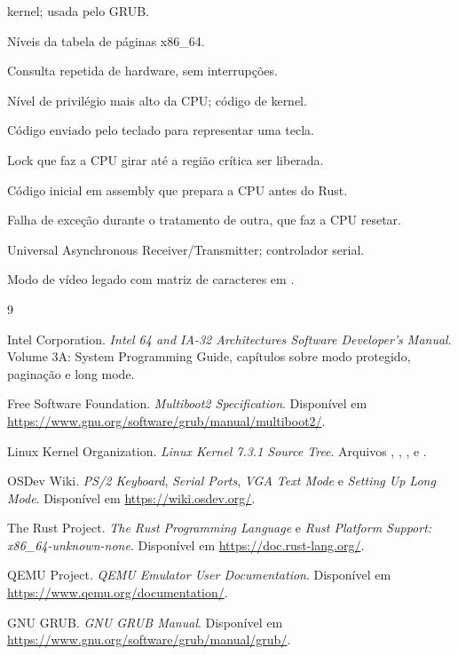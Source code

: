 \begin{description}[style=nextline,leftmargin=2em]
        kernel; usada pelo GRUB.
  \item[PML4/PDPT/PD] N\'iveis da tabela de p\'aginas x86\_64.
  \item[Polling] Consulta repetida de hardware, sem interrup\c{c}\~oes.
  \item[Ring 0] N\'ivel de privil\'egio mais alto da CPU; c\'odigo de kernel.
  \item[Scancode] C\'odigo enviado pelo teclado para representar uma tecla.
  \item[Spinlock] Lock que faz a CPU girar at\'e a regi\~ao cr\'itica ser
        liberada.
  \item[Stub] C\'odigo inicial em assembly que prepara a CPU antes do Rust.
  \item[Triple fault] Falha de exce\c{c}\~ao durante o tratamento de outra,
        que faz a CPU resetar.
  \item[UART] Universal Asynchronous Receiver/Transmitter; controlador
        serial.
  \item[VGA texto] Modo de v\'ideo legado com matriz de caracteres em
        .
\end{description}

\begin{thebibliography}{9}

Intel Corporation.
\newblock \emph{Intel 64 and IA-32 Architectures Software Developer's
Manual}.
\newblock Volume 3A: System Programming Guide, cap\'itulos sobre modo
protegido, pagina\c{c}\~ao e long mode.

Free Software Foundation.
\newblock \emph{Multiboot2 Specification}.
\newblock Dispon\'ivel em \url{https://www.gnu.org/software/grub/manual/multiboot2/}.

Linux Kernel Organization.
\newblock \emph{Linux Kernel 7.3.1 Source Tree}.
\newblock Arquivos , ,
,  e .

OSDev Wiki.
\newblock \emph{PS/2 Keyboard}, \emph{Serial Ports}, \emph{VGA Text Mode} e
\emph{Setting Up Long Mode}.
\newblock Dispon\'ivel em \url{https://wiki.osdev.org/}.

The Rust Project.
\newblock \emph{The Rust Programming Language} e \emph{Rust Platform Support:
x86\_64-unknown-none}.
\newblock Dispon\'ivel em \url{https://doc.rust-lang.org/}.

QEMU Project.
\newblock \emph{QEMU Emulator User Documentation}.
\newblock Dispon\'ivel em \url{https://www.qemu.org/documentation/}.

GNU GRUB.
\newblock \emph{GNU GRUB Manual}.
\newblock Dispon\'ivel em \url{https://www.gnu.org/software/grub/manual/grub/}.

\end{thebibliography}
